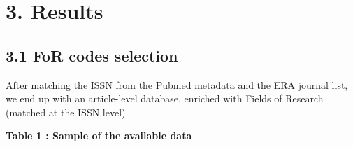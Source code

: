 \documentclass[
]{article}
\begin{document}
\hypertarget{results}{%
\section{3. Results}\label{results}}

\hypertarget{for-codes-selection}{%
\subsection{3.1 FoR codes selection}\label{for-codes-selection}}

After matching the ISSN from the Pubmed metadata and the ERA journal
list, we end up with an article-level database, enriched with Fields of
Research (matched at the ISSN level)

\newpage

\textbf{Table 1 : Sample of the available data}
\end{document}
